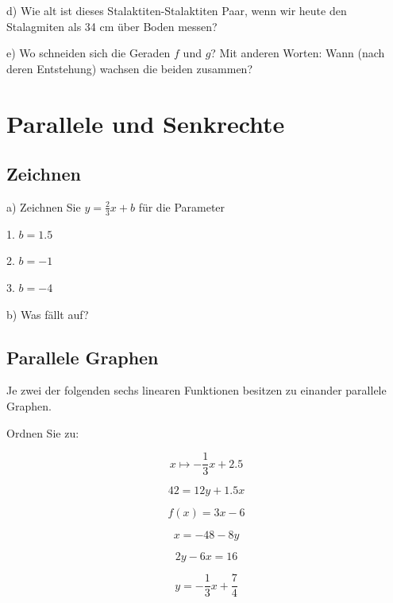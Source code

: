 d) Wie alt ist dieses Stalaktiten-Stalaktiten Paar, wenn wir heute den Stalagmiten als 34 cm über Boden messen?

e) Wo schneiden sich die Geraden $f$ und $g$? Mit anderen Worten: Wann
(nach deren Entstehung) wachsen die beiden zusammen?


\section{Parallele und Senkrechte}
\subsection{Zeichnen}
a) Zeichnen Sie $y=\frac23x+b$ für die Parameter

1. $b=1.5$

2. $b=-1$

3. $b= -4$


b) Was fällt auf?
\newpage
\subsection{Parallele Graphen}
Je zwei der folgenden sechs linearen Funktionen besitzen zu einander parallele
Graphen.

Ordnen Sie zu:

$$x\mapsto -\frac13 x + 2.5$$

$$42 = 12y + 1.5x$$

$$f(x) = 3x-6$$

$$x=-48-8y$$

$$2y-6x = 16$$

$$y= - \frac13 x + \frac74$$


